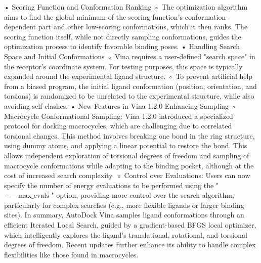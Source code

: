 \documentclass[11pt]{article}
\begin{document}
• Scoring Function and Conformation Ranking
    ◦ The optimization algorithm aims to find the global minimum of the scoring function's conformation-dependent part and other low-scoring conformations, which it then ranks. The scoring function itself, while not directly sampling conformations, guides the optimization process to identify favorable binding poses.
• Handling Search Space and Initial Conformations
    ◦ Vina requires a user-defined "search space" in the receptor's coordinate system. For testing purposes, this space is typically expanded around the experimental ligand structure.
    ◦ To prevent artificial help from a biased program, the initial ligand conformation (position, orientation, and torsions) is randomized to be unrelated to the experimental structure, while also avoiding self-clashes.
• New Features in Vina 1.2.0 Enhancing Sampling
    ◦ Macrocycle Conformational Sampling: Vina 1.2.0 introduced a specialized protocol for docking macrocycles, which are challenging due to correlated torsional changes. This method involves breaking one bond in the ring structure, using dummy atoms, and applying a linear potential to restore the bond. This allows independent exploration of torsional degrees of freedom and sampling of macrocycle conformations while adapting to the binding pocket, although at the cost of increased search complexity.
    ◦ Control over Evaluations: Users can now specify the number of energy evaluations to be performed using the " $--\text{max}\_\text{evals}$ " option, providing more control over the search algorithm, particularly for complex searches (e.g., more flexible ligands or larger binding sites).
In summary, AutoDock Vina samples ligand conformations through an efficient Iterated Local Search, guided by a gradient-based BFGS local optimizer, which intelligently explores the ligand's translational, rotational, and torsional degrees of freedom. Recent updates further enhance its ability to handle complex flexibilities like those found in macrocycles.
\end{document}
